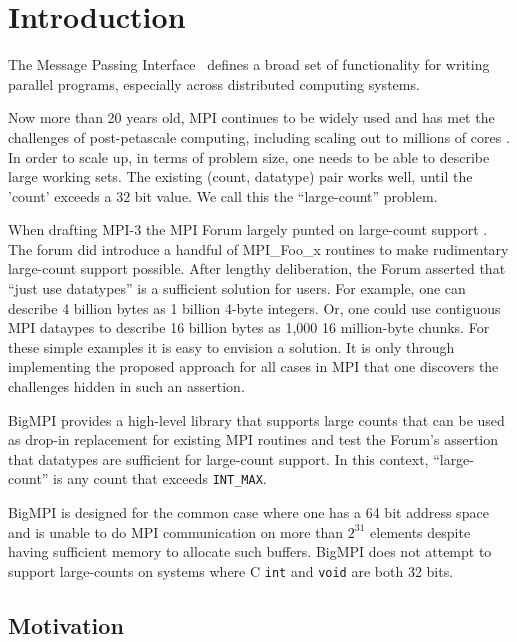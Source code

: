 
\section{Introduction}

The Message Passing Interface~\cite{mpiforum:94, mpiforum:96, mpiforum:09, mpiforum:12} 
defines a broad set of functionality for writing parallel programs, especially across
distributed computing systems.

Now more than 20 years old, MPI continues to be widely used and has met the challenges of
post-petascale computing, including scaling out to millions of cores
\cite{balaji2011mpi}. In order to scale up, in terms of problem size, one needs
to be able to describe large working sets.  The existing (count, datatype) pair
works well, until the 'count' exceeds a 32 bit value.  We call this the ``large-count'' problem.

When drafting MPI-3 the MPI Forum largely punted on large-count support .
%
The forum did introduce a handful of MPI\_Foo\_x routines to make rudimentary
large-count support possible.  After lengthy deliberation, the
%
Forum asserted that ``just use datatypes'' is a sufficient solution for users.
For example, one can describe 4 billion bytes as 1 billion 4-byte integers.
Or, one could use contiguous MPI dataypes to describe 16 billion bytes as 1,000
16 million-byte chunks.  For these simple examples it is easy to envision a
solution. It is only through implementing the proposed approach for all cases
in MPI that one discovers the challenges hidden in such an assertion.

BigMPI provides a high-level library that supports large counts that can be used as 
drop-in replacement for existing MPI routines and test the Forum's assertion
that datatypes are sufficient for large-count support.  In this context,
``large-count'' is any count that exceeds \texttt{INT\_MAX}. 


BigMPI is designed for the common case where one has a 64 bit address
space and is unable to do MPI communication on more than $2^{31}$ elements
despite having sufficient memory to allocate such buffers.
BigMPI does not attempt to support large-counts on systems where
C \texttt{int} and \texttt{void\*} are both 32 bits.

\subsection{Motivation}


